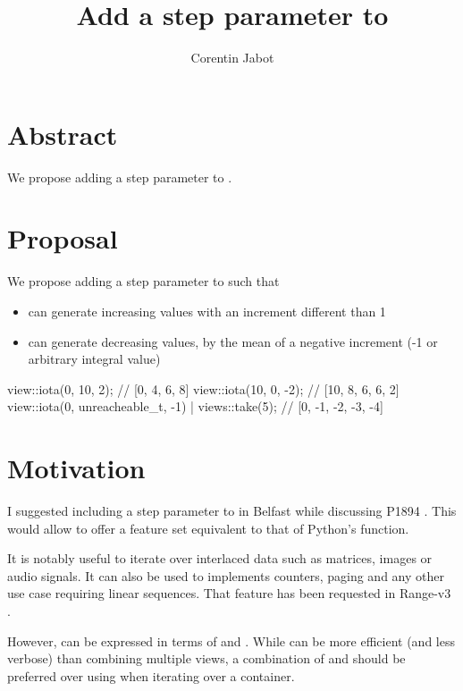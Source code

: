 \documentclass{wg21}
\title{Add a step parameter to \tcode{iota\_view}}
\author{Corentin Jabot}{corentin.jabot@gmail.com}
\begin{document}
    
\maketitle


\section{Abstract}

We propose adding a step parameter to .

\section{Proposal}

We propose adding a step parameter to  such that

\begin{itemize}
\item {} can generate increasing values with an increment different than 1
\item {} can generate decreasing values, by the mean of a negative increment (-1 or arbitrary integral value) 
\end{itemize}

\begin{colorblock}
view::iota(0, 10, 2); // [0, 4, 6, 8]
view::iota(10, 0, -2); // [10, 8, 6, 6, 2]
view::iota(0, unreacheable_t{}, -1) | views::take(5); // [0, -1, -2, -3, -4]
\end{colorblock}

\section{Motivation}

I suggested including a step parameter to  in Belfast while discussing P1894 \cite{P1894R0}.
This would allow  to offer a feature set equivalent to that of Python's  function.

It is notably useful to iterate over interlaced data such as matrices, images or audio signals.
It can also be used to implements counters, paging and any other use case requiring linear sequences.
That feature has been requested in Range-v3 \cite{RangeV3}.


However,  can be expressed in terms of  \cite{P1899R0} and .
While  can be more efficient (and less verbose) than combining multiple views, a combination of  and  should be preferred over using  when iterating over a container.
\end{document}
